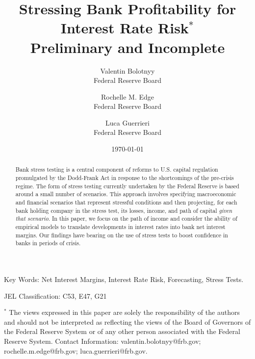 \documentclass[11pt]{article}
\renewcommand{\baselinestretch}{1.5}
\begin{document}
\renewcommand{\baselinestretch}{1}
\author{{\Large Valentin Bolotnyy} \\
Federal Reserve Board \and
{\Large Rochelle M. Edge} \\
Federal Reserve Board \and
{\Large Luca Guerrieri}\\ Federal Reserve Board} 
\title{Stressing Bank Profitability for Interest Rate Risk$^*$ \\ \vspace{0.5cm} Preliminary and Incomplete \vspace{0.5cm}}

 
\date{\today}
\maketitle

\begin{abstract}
\noindent Bank stress testing  is a central component of reforms to U.S. capital regulation promulgated by the Dodd-Frank Act in response to the shortcomings of the pre-crisis regime. The form of stress testing currently undertaken by the Federal Reserve is based around a small number of scenarios.  This approach involves specifying macroeconomic and financial scenarios that represent stressful conditions and then projecting, for each bank holding company in the stress test, its losses, income, and path of capital \textit{given that scenario}. In this paper, we focus on the path of income and consider the ability of empirical models to translate developments in interest rates into bank net interest margins. Our findings have bearing on the use of stress tests to boost confidence in banks in periods of crisis.
\end{abstract}

\vspace{.125in}

\noindent Key Words: Net Interest Margins, Interest Rate Risk, Forecasting, Stress Tests.

\vspace{.125in}

\noindent JEL Classification: C53, E47, G21

\vspace{1.5cm} \renewcommand{\baselinestretch}{1} \normalsize
\noindent $^*$ The views
expressed in this paper are solely the responsibility of the
authors and should not be interpreted as reflecting the views of
the Board of Governors of the Federal Reserve System or of any
other person associated with the Federal Reserve System.
Contact Information: valentin.bolotnyy@frb.gov; rochelle.m.edge@frb.gov; luca.guerrieri@frb.gov.
\end{document}
